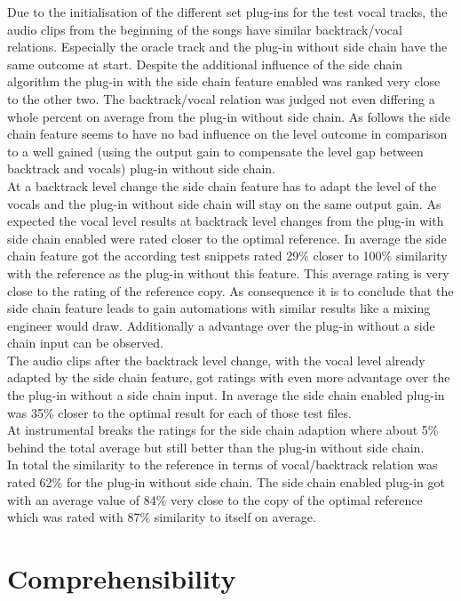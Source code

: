 Due to the initialisation of the different set plug-ins for the test vocal tracks, the audio clips from the beginning of the songs have similar backtrack/vocal relations. Especially the oracle track and the plug-in without side chain have the same outcome at start. Despite the additional influence of the side chain algorithm the plug-in with the side chain feature enabled was ranked very close to the other two. The backtrack/vocal relation was judged not even differing a whole percent on average from the plug-in without side chain. As follows the side chain feature seems to have no bad influence on the level outcome in comparison to a well gained (using the output gain to compensate the level gap between backtrack and vocals) plug-in without side chain.\\
At a backtrack level change the side chain feature has to adapt the level of the vocals and the plug-in without side chain will stay on the same output gain. As expected the vocal level results at backtrack level changes from the plug-in with side chain enabled were rated closer to the optimal reference. In average the side chain feature got the according test snippets rated 29\% closer to 100\% similarity with the reference as the plug-in without this feature. This average rating is very close to the rating of the reference copy. As consequence it is to conclude that the side chain feature leads to gain automations with similar results like a mixing engineer would draw. Additionally a advantage over the plug-in without a side chain input can be observed.\\
The audio clips after the backtrack level change, with the vocal level already adapted by the side chain feature, got ratings with even more advantage over the the plug-in without a side chain input. In average the side chain enabled plug-in was 35\% closer to the optimal result for each of those test files.\\
At instrumental breaks the ratings for the side chain adaption where about 5\% behind the total average but still better than the plug-in without side chain.\\
In total the similarity to the reference in terms of vocal/backtrack relation was rated 62\% for the plug-in without side chain. The side chain enabled plug-in got with an average value of 84\% very close to the copy of the optimal reference which was rated with 87\% similarity to itself on average.\\

\section{Comprehensibility}

